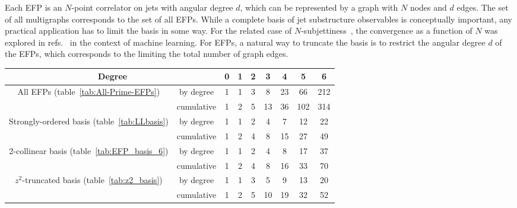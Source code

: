 \documentclass[a4paper,11pt]{article}
\newcommand{\tab}[1]{table~\ref{tab:#1}}
\newcommand{\refscite}[1]{refs.~\cite{#1}}
\begin{document}
Each EFP is an $N$-point correlator on jets with angular degree $d$, which can be represented by a graph with $N$ nodes and $d$ edges.
%
The set of all multigraphs corresponds to the set of all EFPs.
%
While a complete basis of jet substructure observables is conceptually important, any practical application has to limit the basis in some way.
%
For the related case of $N$-subjettiness~\cite{Thaler:2010tr,Thaler:2011gf,Stewart:2010tn}, the convergence as a function of $N$ was explored in \refscite{Datta:2017rhs,Moore:2018lsr} in the context of machine learning. 
%
For EFPs, a natural way to truncate the basis is to restrict the angular degree $d$ of the EFPs, which corresponds to the limiting the total number of graph edges.

 \begin{table}[t]
\centering
\begin{tabular}{|cc||c|c|c|c|c|c|c|}
\hline
\multicolumn{2}{|c||}{Degree }                                  & 0 & 1 & 2 & 3 & 4 & 5 & 6 \\ \hline\hline
\multicolumn{1}{|c|}{\multirow{2}{*}{All EFPs (\tab{All-Prime-EFPs})}}                     & by degree    & 1  &  1 & 3  & 8  & 23  & 66  & 212   \\ \cline{2-9} 
\multicolumn{1}{|c|}{}                                                            & cumulative      & 1  &  2 & 5  & 13  & 36  & 102  & 314  \\ \hline\hline

\multicolumn{1}{|c|}{\multirow{2}{*}{Strongly-ordered basis (\tab{LLbasis})}}                       & by degree         & 1 &   1&   2 &  4 & 7  & 12  & 22  \\ \cline{2-9} 
\multicolumn{1}{|c|}{}                                                             & cumulative     & 1 &   2 &  4 & 8  & 15  & 27  & 49  \\ \hline \hline

\multicolumn{1}{|c|}{\multirow{2}{*}{2-collinear basis (\tab{EFP_basis_6})}}          & by degree        & 1  &  1&  2 & 4  & 8  &17   & 37  \\ \cline{2-9} 
\multicolumn{1}{|c|}{}                                                             &cumulative   & 1  &   2 & 4  & 8  & 16  &  33 & 70  \\ \hline \hline

\multicolumn{1}{|c|}{\multirow{2}{*}{$z^2$-truncated basis (\tab{z2_basis})}} & by degree      & 1 &   1&   3&  5 & 9  & 13  & 20  \\ \cline{2-9} 
\multicolumn{1}{|c|}{}                                                             & cumulative     & 1 &   2 &  5 & 10  & 19  & 32  & 52 \\ \hline \hline


\end{tabular}
\end{table}
\end{document}
